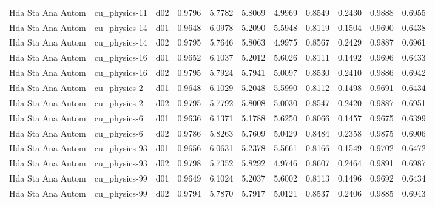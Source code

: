 \begin{longtable}{lllrrrrrrrr}
    Hda Sta Ana Autom  &         cu\_physics-11 &     d02 &   0.9796 &   5.7782 &   5.8069 &       4.9969 &        0.8549 &       0.2430 &           0.9888 &  0.6955 \\
    Hda Sta Ana Autom  &         cu\_physics-14 &     d01 &   0.9648 &   6.0978 &   5.2090 &       5.5948 &        0.8119 &       0.1504 &           0.9690 &  0.6438 \\
    Hda Sta Ana Autom  &         cu\_physics-14 &     d02 &   0.9795 &   5.7646 &   5.8063 &       4.9975 &        0.8567 &       0.2429 &           0.9887 &  0.6961 \\
    Hda Sta Ana Autom  &         cu\_physics-16 &     d01 &   0.9652 &   6.1037 &   5.2012 &       5.6026 &        0.8111 &       0.1492 &           0.9696 &  0.6433 \\
    Hda Sta Ana Autom  &         cu\_physics-16 &     d02 &   0.9795 &   5.7924 &   5.7941 &       5.0097 &        0.8530 &       0.2410 &           0.9886 &  0.6942 \\
    Hda Sta Ana Autom  &          cu\_physics-2 &     d01 &   0.9648 &   6.1029 &   5.2048 &       5.5990 &        0.8112 &       0.1498 &           0.9691 &  0.6434 \\
    Hda Sta Ana Autom  &          cu\_physics-2 &     d02 &   0.9795 &   5.7792 &   5.8008 &       5.0030 &        0.8547 &       0.2420 &           0.9887 &  0.6951 \\
    Hda Sta Ana Autom  &          cu\_physics-6 &     d01 &   0.9636 &   6.1371 &   5.1788 &       5.6250 &        0.8066 &       0.1457 &           0.9675 &  0.6399 \\
    Hda Sta Ana Autom  &          cu\_physics-6 &     d02 &   0.9786 &   5.8263 &   5.7609 &       5.0429 &        0.8484 &       0.2358 &           0.9875 &  0.6906 \\
    Hda Sta Ana Autom  &         cu\_physics-93 &     d01 &   0.9656 &   6.0631 &   5.2378 &       5.5661 &        0.8166 &       0.1549 &           0.9702 &  0.6472 \\
    Hda Sta Ana Autom  &         cu\_physics-93 &     d02 &   0.9798 &   5.7352 &   5.8292 &       4.9746 &        0.8607 &       0.2464 &           0.9891 &  0.6987 \\
    Hda Sta Ana Autom  &         cu\_physics-99 &     d01 &   0.9649 &   6.1024 &   5.2037 &       5.6002 &        0.8113 &       0.1496 &           0.9692 &  0.6434 \\
    Hda Sta Ana Autom  &         cu\_physics-99 &     d02 &   0.9794 &   5.7870 &   5.7917 &       5.0121 &        0.8537 &       0.2406 &           0.9885 &  0.6943 \\

\end{longtable}

